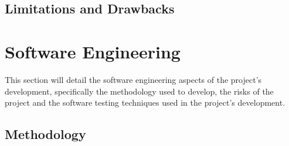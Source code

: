 \documentclass[12pt]{article}
\begin{document}

    \subsection{Limitations and Drawbacks}\label{subsec:limitations-and-drawbacks}




    \pagebreak


    \section{Software Engineering}\label{sec:software-engineering}

    \tab
    This section will detail the software engineering aspects of the project's development, specifically the
    methodology used to develop, the risks of the project and the software testing techniques used in the project's
    development.


    \subsection{Methodology}\label{subsec:methodology}

\end{document}
